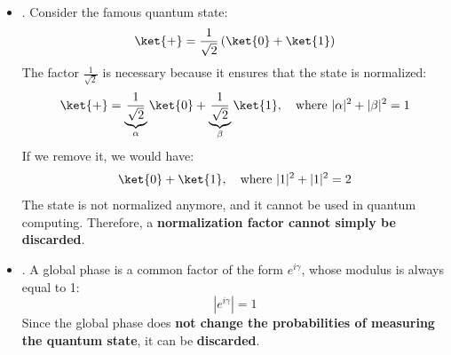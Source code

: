 \begin{itemize}
    \item {}. Consider the famous quantum state:
    \begin{equation*}
        \ket{+} = \frac{1}{\sqrt{2}}\left(\ket{0} + \ket{1}\right)
    \end{equation*}
    The factor $\frac{1}{\sqrt{2}}$ is necessary because it ensures that the state is normalized:
    \begin{equation*}
        \ket{+} = \underbrace{\frac{1}{\sqrt{2}}}_{\alpha} \ket{0} + \underbrace{\frac{1}{\sqrt{2}}}_{\beta} \ket{1}, \quad \text{where } |\alpha|^2 + |\beta|^2 = 1
    \end{equation*}
    If we remove it, we would have:
    \begin{equation*}
        \ket{0} + \ket{1}, \quad \text{where } |1|^2 + |1|^2 = 2
    \end{equation*}
    The state is not normalized anymore, and it cannot be used in quantum computing. Therefore, a \textbf{normalization factor cannot simply be discarded}.


    \item {}. A global phase is a common factor of the form $e^{i \gamma}$, whose modulus is always equal to 1:
    \begin{equation*}
        \left| e^{i \gamma} \right| = 1
    \end{equation*}
    Since the global phase does \textbf{not change the probabilities of measuring the quantum state}, it can be \textbf{discarded}.


\end{itemize}
